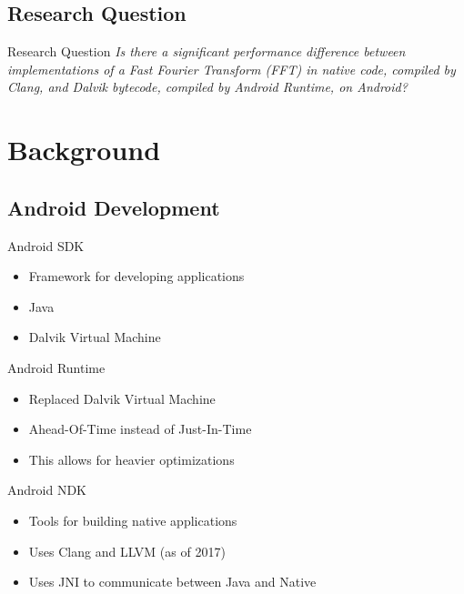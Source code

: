 \documentclass[xcolor={table}]{beamer}
\begin{document}
\subsection{Research Question}
\begin{frame}{Research Question}
\centering
\emph{Is there a significant performance difference between implementations of a Fast Fourier Transform (FFT) in native code, compiled by Clang, and Dalvik bytecode, compiled by Android Runtime, on Android?}
\end{frame}

\section{Background}

\subsection{Android Development}
\begin{frame}{Android SDK}
    \begin{itemize}
        \item Framework for developing applications
        \item Java
        \item Dalvik Virtual Machine
    \end{itemize}
\end{frame}

\begin{frame}{Android Runtime}
    \begin{itemize}
        \item Replaced Dalvik Virtual Machine %
        \item Ahead-Of-Time instead of Just-In-Time
        \item This allows for heavier optimizations
    \end{itemize}
\end{frame}

\begin{frame}{Android NDK}
    \begin{itemize}
        \item Tools for building native applications
        \item Uses Clang and LLVM (as of 2017)
        \item Uses JNI to communicate between Java and Native
    \end{itemize}
\end{frame}
\end{document}
